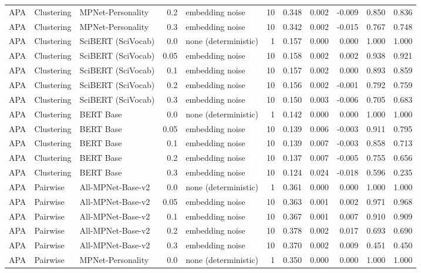 \begin{table}[ht]
\begin{tabular}{lllrlrrrrrr}
APA & Clustering & MPNet-Personality & 0.2 & embedding noise & 10 & 0.348 & 0.002 & -0.009 & 0.850 & 0.836 \\
APA & Clustering & MPNet-Personality & 0.3 & embedding noise & 10 & 0.342 & 0.002 & -0.015 & 0.767 & 0.748 \\
APA & Clustering & SciBERT (SciVocab) & 0.0 & none (deterministic) & 1 & 0.157 & 0.000 & 0.000 & 1.000 & 1.000 \\
APA & Clustering & SciBERT (SciVocab) & 0.05 & embedding noise & 10 & 0.158 & 0.002 & 0.002 & 0.938 & 0.921 \\
APA & Clustering & SciBERT (SciVocab) & 0.1 & embedding noise & 10 & 0.157 & 0.002 & 0.000 & 0.893 & 0.859 \\
APA & Clustering & SciBERT (SciVocab) & 0.2 & embedding noise & 10 & 0.156 & 0.002 & -0.001 & 0.792 & 0.759 \\
APA & Clustering & SciBERT (SciVocab) & 0.3 & embedding noise & 10 & 0.150 & 0.003 & -0.006 & 0.705 & 0.683 \\
APA & Clustering & BERT Base & 0.0 & none (deterministic) & 1 & 0.142 & 0.000 & 0.000 & 1.000 & 1.000 \\
APA & Clustering & BERT Base & 0.05 & embedding noise & 10 & 0.139 & 0.006 & -0.003 & 0.911 & 0.795 \\
APA & Clustering & BERT Base & 0.1 & embedding noise & 10 & 0.139 & 0.007 & -0.003 & 0.858 & 0.713 \\
APA & Clustering & BERT Base & 0.2 & embedding noise & 10 & 0.137 & 0.007 & -0.005 & 0.755 & 0.656 \\
APA & Clustering & BERT Base & 0.3 & embedding noise & 10 & 0.124 & 0.024 & -0.018 & 0.596 & 0.235 \\
APA & Pairwise & All-MPNet-Base-v2 & 0.0 & none (deterministic) & 1 & 0.361 & 0.000 & 0.000 & 1.000 & 1.000 \\
APA & Pairwise & All-MPNet-Base-v2 & 0.05 & embedding noise & 10 & 0.363 & 0.001 & 0.002 & 0.971 & 0.968 \\
APA & Pairwise & All-MPNet-Base-v2 & 0.1 & embedding noise & 10 & 0.367 & 0.001 & 0.007 & 0.910 & 0.909 \\
APA & Pairwise & All-MPNet-Base-v2 & 0.2 & embedding noise & 10 & 0.378 & 0.002 & 0.017 & 0.693 & 0.690 \\
APA & Pairwise & All-MPNet-Base-v2 & 0.3 & embedding noise & 10 & 0.370 & 0.002 & 0.009 & 0.451 & 0.450 \\
APA & Pairwise & MPNet-Personality & 0.0 & none (deterministic) & 1 & 0.350 & 0.000 & 0.000 & 1.000 & 1.000 \\

\end{tabular}
\end{table}
